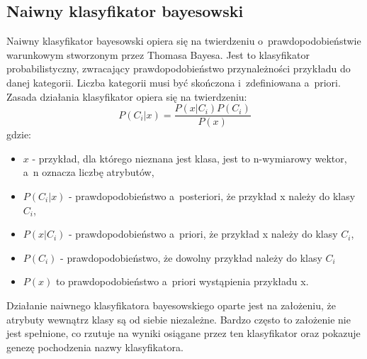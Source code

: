 \subsection{Naiwny klasyfikator bayesowski}
Naiwny klasyfikator bayesowski opiera się na twierdzeniu o~prawdopodobieństwie warunkowym stworzonym przez Thomasa Bayesa. Jest to klasyfikator probabilistyczny, zwracający prawdopodobieństwo przynależności przykładu do danej kategorii. Liczba kategorii musi być skończona i~zdefiniowana a~priori. Zasada działania klasyfikator opiera się na twierdzeniu:
\[P(C_i|x) = \frac{P(x|C_i)P(C_i)}{P(x)}\]
gdzie:
\begin{itemize}
	\item $x$ - przykład, dla którego nieznana jest klasa, jest to n-wymiarowy wektor, a~n oznacza liczbę atrybutów,  
	\item $P(C_i|x)$ - prawdopodobieństwo a~posteriori, że przykład x należy do klasy $C_i$,
	\item $P(x|C_i)$ - prawdopodobieństwo a~priori, że przykład x należy do klasy $C_i$,
	\item $P(C_i)$ - prawdopodobieństwo, że dowolny przykład należy do klasy $C_i$
	\item $P(x)$ to prawdopodobieństwo a~priori wystąpienia przykładu x.
\end{itemize}
Działanie naiwnego klasyfikatora bayesowskiego oparte jest na założeniu, że atrybuty wewnątrz klasy są od siebie niezależne. Bardzo często to założenie nie jest spełnione, co rzutuje na wyniki osiągane przez ten klasyfikator oraz pokazuje genezę pochodzenia nazwy klasyfikatora.

